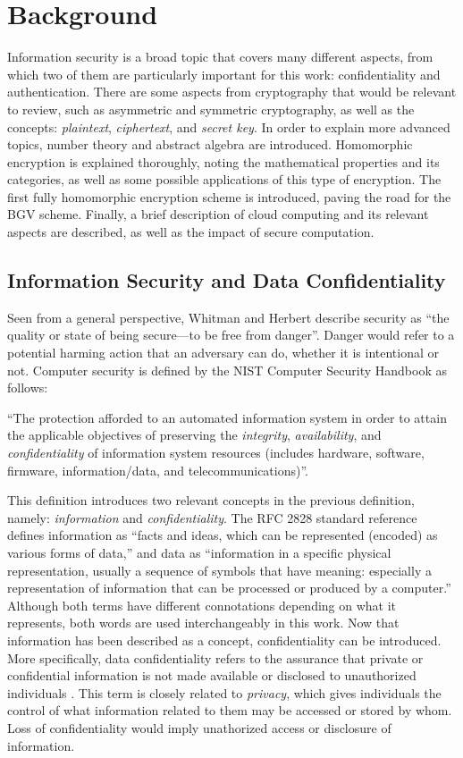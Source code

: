 \chapter{Background}
\label{background}

Information security is a broad topic that covers many different aspects, from which two of them are particularly important for this work: confidentiality and authentication. There are some aspects from cryptography that would be relevant to review, such as asymmetric and symmetric cryptography, as well as the concepts: \emph{plaintext}, \emph{ciphertext}, and \emph{secret key}. In order to explain more advanced topics, number theory and abstract algebra are introduced. Homomorphic encryption is explained thoroughly, noting the mathematical properties and its categories, as well as some possible applications of this type of encryption. The first fully homomorphic encryption scheme is introduced, paving the road for the BGV scheme. Finally, a brief description of cloud computing and its relevant aspects are described, as well as the impact of secure computation.

\section{Information Security and Data Confidentiality}

Seen from a general perspective, Whitman and Herbert \cite{PrinciplesInformationSecurity} describe security as ``the quality or state of being secure---to be free from danger''. Danger would refer to a potential harming action that an adversary can do, whether it is intentional or not. Computer security is defined by the NIST Computer Security Handbook \cite{NIST95} as follows:

``The protection afforded to an automated information system in order to attain the applicable objectives of preserving the \emph{integrity}, \emph{availability}, and \emph{confidentiality} of information system resources (includes hardware, software, firmware, information/data, and telecommunications)''.

This definition introduces two relevant concepts in the previous definition, namely: \emph{information} and \emph{confidentiality}. The RFC 2828 standard reference \cite{shirey2000rfc} defines information as ``facts and ideas, which can be represented (encoded) as various forms of data,'' and data as ``information in a specific physical representation, usually a sequence of symbols that have meaning: especially a representation of information that can be processed or produced by a computer.'' Although both terms have different connotations depending on what it represents, both words are used interchangeably in this work. Now that information has been described as a concept, confidentiality can be introduced. More specifically, data confidentiality refers to the assurance that private or confidential information is not made available or disclosed to unauthorized individuals \cite{CryptoStallings}. This term is closely related to \textit{privacy}, which gives individuals the control of what information related to them may be accessed or stored by whom. Loss of confidentiality would imply unathorized access or disclosure of information.

